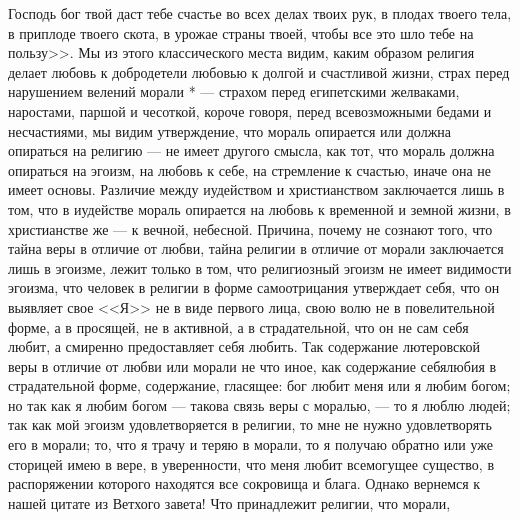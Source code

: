 \documentclass[12pt]{article}
\begin{document}
Господь бог твой даст тебе счастье во всех делах твоих рук, в плодах твоего тела, в приплоде твоего скота, в урожае страны твоей, чтобы все это шло тебе на пользу>>. Мы из этого классического места видим, каким образом религия делает любовь к добродетели любовью к долгой и счастливой жизни, страх перед нарушением велений морали * --- страхом перед египетскими желваками, наростами, паршой и чесоткой, короче говоря, перед всевозможными бедами и несчастиями, мы видим утверждение, что мораль опирается или должна опираться на религию --- не имеет другого смысла, как тот, что мораль должна опираться на эгоизм, на любовь к себе, на стремление к счастью, иначе она не имеет основы. Различие между иудейством и христианством заключается лишь в том, что в иудействе мораль опирается на любовь к временной и земной жизни, в христианстве же --- к вечной, небесной. Причина, почему не сознают того, что тайна веры в отличие от любви, тайна религии в отличие от морали заключается лишь в эгоизме, лежит только в том, что религиозный эгоизм не имеет видимости эгоизма, что человек в религии в форме самоотрицания утверждает себя, что он выявляет свое <<Я>> не в виде первого лица, свою волю не в повелительной форме, а в просящей, не в активной, а в страдательной, что он не сам себя любит, а смиренно предоставляет себя любить. Так содержание лютеровской веры в отличие от любви или морали не что иное, как содержание себялюбия в страдательной форме, содержание, гласящее: бог любит меня или я любим богом; но так как я любим богом --- такова связь веры с моралью, --- то я люблю людей; так как мой эгоизм удовлетворяется в религии, то мне не нужно удовлетворять его в морали; то, что я трачу и теряю в морали, то я получаю обратно или уже сторицей имею в вере, в уверенности, что меня любит всемогущее существо, в распоряжении которого находятся все сокровища и блага. Однако вернемся к нашей цитате из Ветхого завета! Что принадлежит религии, что морали, 
\end{document}

